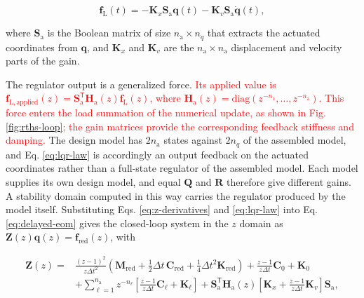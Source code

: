 \documentclass[a4paper,fleqn,review,12pt]{cas-sc}
\numberwithin{equation}{section}
\newcommand{\rev}[1]{\textcolor{red}{#1}}
\begin{document}
\vspace{-3.5em}
\begin{equation}
	\bm{f}_{\mathrm{L}}(t)=
	-\mathbf{K}_{x}\mathbf{S}_{\mathrm{a}}\bm{q}(t)
	-\mathbf{K}_{v}\mathbf{S}_{\mathrm{a}}\dot{\bm{q}}(t),
	\label{eq:lqr-law}
\end{equation}
\vspace{-3.5em}

\noindent where \(\mathbf{S}_{\mathrm{a}}\) is the Boolean matrix of size \(n_{\mathrm{a}}\times n_{q}\) that extracts the actuated coordinates from \(\bm{q}\), and \(\mathbf{K}_{x}\) and \(\mathbf{K}_{v}\) are the \(n_{\mathrm{a}}\times n_{\mathrm{a}}\) displacement and velocity parts of the gain.

The regulator output is a generalized force. \rev{Its applied value is \(\bm f_{\mathrm{L,applied}}(z)=\mathbf S_{\mathrm a}^{\mathsf T}\mathbf H_{\mathrm a}(z)\bm f_{\mathrm L}(z)\), where \(\mathbf H_{\mathrm a}(z)=\mathrm{diag}(z^{-n_1},\ldots,z^{-n_{\mathrm a}})\). This force enters the load summation of the numerical update, as shown in Fig. \ref{fig:rths-loop}; the gain matrices provide the corresponding feedback stiffness and damping.} The design model has \(2n_{\mathrm{a}}\) states against \(2n_{q}\) of the assembled model, and Eq. \eqref{eq:lqr-law} is accordingly an output feedback on the actuated coordinates rather than a full-state regulator of the assembled model. Each model supplies its own design model, and equal \(\mathbf{Q}\) and \(\mathbf{R}\) therefore give different gains. A stability domain computed in this way carries the regulator produced by the model itself.
Substituting Eqs. \eqref{eq:z-derivatives} and \eqref{eq:lqr-law} into Eq. \eqref{eq:delayed-eom} gives the closed-loop system in the \(z\) domain as \(\mathbf{Z}(z)\bm{q}(z)=\bm{f}_{\mathrm{red}}(z)\), with

\vspace{-3.5em}
\begin{equation}
	\begin{aligned}
		\mathbf{Z}(z)={}&
		\frac{(z-1)^{2}}{z\Delta t^{2}}
		\left(\mathbf{M}_{\mathrm{red}}
		+\tfrac{1}{2}\Delta t\,\mathbf{C}_{\mathrm{red}}
		+\tfrac{1}{4}\Delta t^{2}\mathbf{K}_{\mathrm{red}}\right)
		+\frac{z-1}{z\Delta t}\mathbf{C}_{0}+\mathbf{K}_{0}\\
		&+\sum_{\ell=1}^{n_{\mathrm{a}}}z^{-n_{\ell}}
		\left[
		\frac{z-1}{z\Delta t}\mathbf{C}_{\ell}+\mathbf{K}_{\ell}
		\right]
		+\mathbf{S}_{\mathrm{a}}^{\mathsf{T}}\mathbf{H}_{\mathrm{a}}(z)
		\left[
		\mathbf{K}_{x}+\frac{z-1}{z\Delta t}\mathbf{K}_{v}
		\right]\mathbf{S}_{\mathrm{a}},
	\end{aligned}
	\label{eq:z-matrix}
\end{equation}
\vspace{-3.5em}
\end{document}
